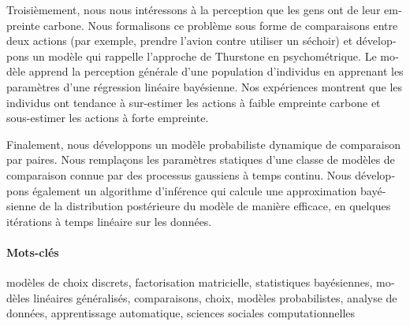 \begin{otherlanguage}{french}
	Troisièmement, nous nous intéressons à la perception que les gens ont de leur empreinte carbone.
	Nous formalisons ce problème sous forme de comparaisons entre deux actions (par exemple, prendre l'avion contre utiliser un séchoir) et développons un modèle qui rappelle l'approche de Thurstone en psychométrique.
	Le modèle apprend la perception générale d'une population d'individus en apprenant les paramètres d'une régression linéaire bayésienne.
	Nos expériences montrent que les individus ont tendance à sur-estimer les actions à faible empreinte carbone et sous-estimer les actions à forte empreinte.

	Finalement, nous développons un modèle probabiliste dynamique de comparaison par paires.
	Nous remplaçons les paramètres statiques d'une classe de modèles de comparaison connue par des processus gaussiens à temps continu.
	Nous développons également un algorithme d'inférence qui calcule une approximation bayésienne de la distribution postérieure du modèle de manière efficace, en quelques itérations à temps linéaire sur les données.

	\paragraph{Mots-clés}
	modèles de choix discrets, factorisation matricielle, statistiques bayésiennes, modèles linéaires généralisés, comparaisons, choix, modèles probabilistes, analyse de données, apprentissage automatique, sciences sociales computationnelles
\end{otherlanguage}
